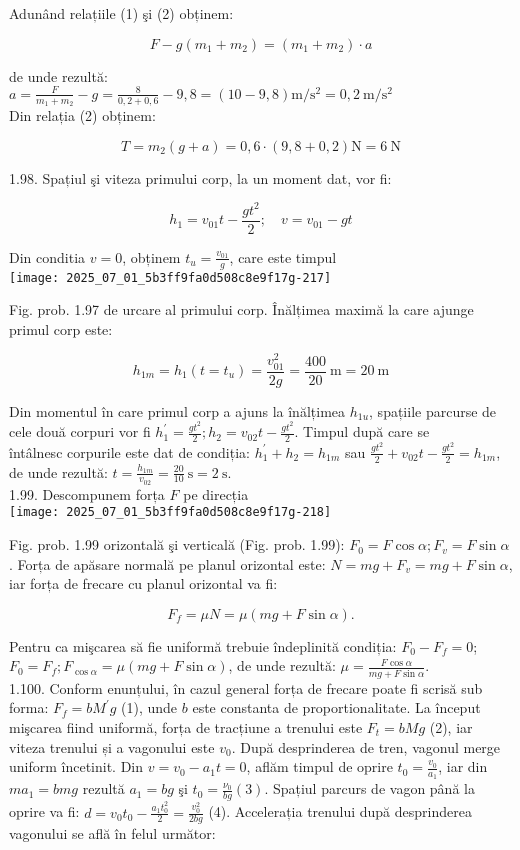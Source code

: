 Adunând relațiile (1) şi (2) obținem:

$$
F-g\left(m_{1}+m_{2}\right)=\left(m_{1}+m_{2}\right) \cdot a
$$

de unde rezultă:\\
$a=\frac{F}{m_{1}+m_{2}}-g=\frac{8}{0,2+0,6}-9,8=(10-9,8) \mathrm{m} / \mathrm{s}^{2}=0,2 \mathrm{~m} / \mathrm{s}^{2}$\\
Din relația (2) obținem:

$$
T=m_{2}(g+a)=0,6 \cdot(9,8+0,2) \mathrm{N}=6 \mathrm{~N}
$$

1.98. Spațiul şi viteza primului corp, la un moment dat, vor fi:

$$
h_{1}=v_{01} t-\frac{g t^{2}}{2} ; \quad v=v_{01}-g t
$$

Din conditia $v=0$, obținem $t_{u}=\frac{v_{01}}{g}$, care este timpul\\
\texttt{[image: 2025\_07\_01\_5b3ff9fa0d508c8e9f17g-217]}

Fig. prob. 1.97 de urcare al primului corp. Înălțimea maximă la care ajunge primul corp este:

$$
h_{1 m}=h_{1}\left(t=t_{u}\right)=\frac{v_{01}^{2}}{2 g}=\frac{400}{20} \mathrm{~m}=20 \mathrm{~m}
$$

Din momentul în care primul corp a ajuns la înălțimea $h_{1 u}$, spațiile parcurse de cele două corpuri vor fi $h_{1}^{\prime}=\frac{g t^{2}}{2} ; h_{2}=v_{02} t-\frac{g t^{2}}{2}$. Timpul după care se\\
întâlnesc corpurile este dat de condiția: $h_{1}^{\prime}+h_{2}=h_{1 m}$ sau $\frac{g t^{2}}{2}+v_{02} t-\frac{g t^{2}}{2}=h_{1 m}$, de unde rezultă: $t=\frac{h_{1 m}}{v_{02}}=\frac{20}{10} \mathrm{~s}=2 \mathrm{~s}$.\\
1.99. Descompunem forța $F$ pe direcția\\
\texttt{[image: 2025\_07\_01\_5b3ff9fa0d508c8e9f17g-218]}

Fig. prob. 1.99 orizontală şi verticală (Fig. prob. 1.99): $F_{0}=F \cos \alpha ; F_{v}=F \sin \alpha$. Forța de apăsare normală pe planul orizontal este: $N=m g+F_{v}=m g+F \sin \alpha$, iar forța de frecare cu planul orizontal va fi:

$$
F_{f}=\mu N=\mu(m g+F \sin \alpha) .
$$

Pentru ca mişcarea să fie uniformă trebuie îndeplinită condiția: $F_{0}-F_{f}=0$; $F_{0}=F_{f} ; F_{\cos \alpha}=\mu(m g+F \sin \alpha)$, de unde rezultă: $\mu=\frac{F \cos \alpha}{m g+F \sin \alpha}$.\\
1.100. Conform enunțului, în cazul general forța de frecare poate fi scrisă sub forma: $F_{f}=b M^{\prime} g$ (1), unde $b$ este constanta de proportionalitate. La început mişcarea fiind uniformă, forța de tracțiune a trenului este $F_{t}=b M g$ (2), iar viteza trenului și a vagonului este $v_{0}$. După desprinderea de tren, vagonul merge uniform încetinit. Din $v=v_{0}-a_{1} t=0$, aflăm timpul de oprire $t_{0}=\frac{v_{0}}{a_{1}}$, iar din $m a_{1}=b m g$ rezultă $a_{1}=b g$ şi $t_{0}=\frac{\nu_{0}}{b g}(3)$. Spațiul parcurs de vagon până la oprire va fi: $d=v_{0} t_{0}-\frac{a_{1} t_{0}^{2}}{2}=\frac{v_{0}^{2}}{2 b g}$ (4). Accelerația trenului după desprinderea vagonului se află în felul următor:

